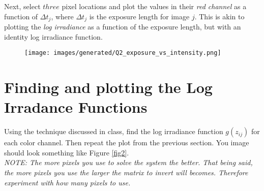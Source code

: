 \documentclass{article}
\begin{document}
\noindent
Next, select $three$ pixel locations and plot the values in their \emph{red channel} as a function of $\Delta t_j$, where $\Delta t_j$ is the exposure length for image $j$.  This is akin to plotting the \emph{log irradiance} as a function of the exposure length, but with an identity log irradiance function.\\

\begin{figure}[h]
    \texttt{[image: images/generated/Q2\_exposure\_vs\_intensity.png]}
\end{figure}

\newpage
\section{Finding and plotting the Log Irradance Functions}
Using the technique discussed in class, find the log irradiance function $g(z_{ij})$ for each color channel.  Then repeat the plot from the previous section.  You image should look something like Figure \ref{fig2}.\\

\noindent
\emph{NOTE:  The more pixels you use to solve the system the better.  That being said, the more pixels you use the larger the matrix to invert will becomes.   Therefore experiment with how many pixels to use.}


\newpage
\end{document}
